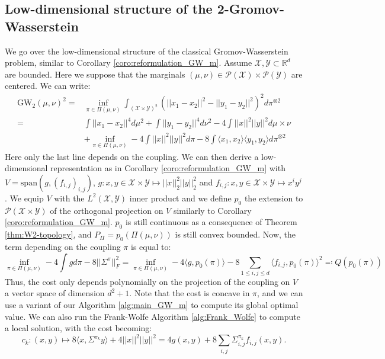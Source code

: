 \documentclass{article}
\newcommand{\R}{\mathbb{R}}
\newcommand{\Y}{\mathcal{Y}}
\newcommand{\X}{\mathcal{X}}
\newcommand{\1}{\mathbf{1}}
\newcommand{\GW}{\mathrm{GW}}
\renewcommand{\P}{\mathcal{P}}
\theoremstyle{definition}
\theoremstyle{remark}
\begin{document}
\begin{appendices}
\subsection{Low-dimensional structure of the 2-Gromov-Wasserstein}\label{sec:classical_gw}
We go over the low-dimensional structure of the classical Gromov-Wasserstein problem, similar to Corollary \ref{coro:reformulation_GW_m}. Assume $\X,\Y\subset \R^d$ are bounded.
Here we suppose that the marginals $(\mu,\nu)\in \P(\X)\times\P(\Y)$ are centered. We can write:
\begin{equation*}
    \begin{split}
        \GW_2(\mu,\nu)^2 =&  \inf_{\pi\in\Pi(\mu,\nu)}\int_{(\X\times\Y)^{2}}(||x_1-x_2||^2-||y_1-y_2||^2)^2d\pi^{\otimes 2}\\
        =&\int||x_1-x_2||^4d\mu^{ 2}+\int||y_1-y_2||^4d\nu^{ 2} - 4 \int||x||^2||y||^2d\mu\times\nu\\
        & +\inf_{\pi\in\Pi(\mu,\nu)}-4\int||x||^2||y||^2d\pi-8\int\langle x_1,x_2\rangle\langle y_1,y_2\rangle d\pi^{\otimes 2}
    \end{split}
\end{equation*}
Here only the last line depends on the coupling. We can then derive a low-dimensional representation as in Corollary \ref{coro:reformulation_GW_m} with $V=\mathrm{span}(g, (f_{i,j})_{i,j})$, $g:x,y\in \X\times\Y\mapsto ||x||^2_2||y||^2_2$ and $f_{i,j}:x,y\in \X\times\Y\mapsto x^iy^j$. We equip $V$ with the $L^2(\X,\Y)$ inner product and we define $p_0$ the extension to $\P(\X\times\Y)$ of the orthogonal projection on $V$ similarly to  Corollary \ref{coro:reformulation_GW_m}. $p_0$ is still continuous as a consequence of Theorem \ref{thm:W2-topology}, and $P_\Pi=p_0(\Pi(\mu,\nu))$ is still convex bounded. 
Now, the term depending on the coupling $\pi$ is equal to:
\[\inf_{\pi\in\Pi(\mu,\nu)} -4 \int gd\pi-8||\Sigma^\pi||_F^2= \inf_{\pi\in\Pi(\mu,\nu)} -4 \langle g,p_0(\pi)\rangle-8\sum_{1\leq i,j\leq d} \langle f_{i,j},p_0(\pi)\rangle^2\eqqcolon Q(p_0(\pi))\]
Thus, the cost only depends polynomially on the projection of the coupling on $V$ a vector space of dimension $d^2+1$. Note that the cost is concave in $\pi$, and we can use a variant of our Algorithm \ref{alg:main_GW_m} to compute its global optimal value. We can also run the Frank-Wolfe Algorithm \ref{alg:Frank_Wolfe} to compute a local solution, with the cost becoming:
\begin{equation*}
    c_k:(x,y)\mapsto 8\langle  x, \Sigma^{\pi_k}  y\rangle +4 ||x||^2||y||^2= 4 g(x,y)+8\sum_{i,j}  \Sigma^{\pi_k}_{i,j}f_{i,j}(x,y).
\end{equation*}




\end{appendices}
\end{document}
